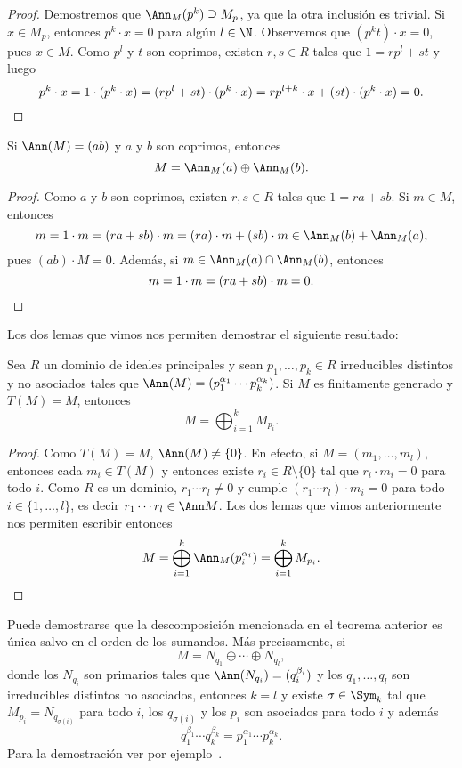 \begin{proof}
Demostremos que $\Ann_M(p^k)\supseteq M_p$, ya que la otra inclusión es trivial. 
Si $x\in M_p$, entonces $p^k\cdot x=0$ para algún $l\in\N$. Observemos que 
$(p^kt)\cdot x=0$, pues $x\in M$. Como $p^l$ y $t$ son coprimos, existen 
$r,s\in R$ tales que $1=rp^l+st$ y luego
\[
p^k\cdot x=1\cdot (p^k\cdot x)=(rp^l+st)\cdot (p^k\cdot x)=rp^{l+k}\cdot x+(st)\cdot (p^k\cdot x)=0.\qedhere	
\]
\end{proof}

\begin{lemma} 
\label{lem:Ann(ab)}
Si $\Ann(M)=(ab)$ y $a$ y $b$ son coprimos, entonces 
\[
M=\Ann_M(a)\oplus\Ann_M(b).
\] 	
\end{lemma}

\begin{proof}
	Como $a$ y $b$ son coprimos, existen $r,s\in R$ tales que $1=ra+sb$. Si $m\in M$, entonces
	\[
	m=1\cdot m=(ra+sb)\cdot m=(ra)\cdot m+(sb)\cdot m\in\Ann_M(b)+\Ann_M(a),
	\]
	pues $(ab)\cdot M=0$. Además, si $m\in\Ann_M(a)\cap\Ann_M(b)$, entonces 
	\[
	m=1\cdot m=(ra+sb)\cdot m=0.\qedhere
	\]
\end{proof}

Los dos lemas que vimos nos permiten demostrar el siguiente resultado:

\begin{theorem}
Sea $R$ un dominio de ideales principales y 
sean $p_1,\dots,p_k\in R$ irreducibles distintos y no asociados tales que $\Ann(M)=(p_1^{\alpha_1}\cdots p_k^{\alpha_k})$. 
Si $M$ es finitamente generado y $T(M)=M$, entonces 
\[
M=\bigoplus_{i=1}^kM_{p_i}.
\]   
\end{theorem}

\begin{proof}
	Como $T(M)=M$, $\Ann(M)\ne\{0\}$. En efecto, si $M=(m_1,\dots,m_l)$, entonces cada $m_i\in T(M)$ y 
	entonces existe $r_i\in R\setminus\{0\}$ tal que $r_i\cdot m_i=0$ para todo $i$. Como $R$ es un dominio, $r_1\cdots r_l\ne 0$ 
	y cumple $(r_1\cdots r_l)\cdot m_i=0$ para todo $i\in\{1,\dots,l\}$, es decir $r_1\cdots r_l\in\Ann M$. Los dos lemas
	que vimos anteriormente nos permiten escribir entonces
	\[
	M=\bigoplus_{i=1}^k\Ann_M(p_i^{\alpha_i})=\bigoplus_{i=1}^k M_{p_i}.\qedhere
	\] 
\end{proof}
 
Puede demostrarse que la descomposición mencionada en el teorema anterior es única salvo en el orden de los sumandos. 
Más precisamente, si \[
M=N_{q_1}\oplus\cdots\oplus N_{q_l},
\]
donde los $N_{q_i}$ son primarios tales que 
$\Ann(N_{q_i})=(q_i^{\beta_i})$ 
y los $q_1,\dots,q_l$ son irreducibles distintos no asociados, entonces $k=l$ y existe $\sigma\in\Sym_k$ tal que
$M_{p_i}=N_{q_{\sigma(i)}}$ para todo $i$, los $q_{\sigma(i)}$ y los $p_i$ son asociados para todo $i$ y además 
\[
q_1^{\beta_1}\cdots q_k^{\beta_k}=p_1^{\alpha_1}\cdots p_k^{\alpha_k}.
\]
Para la demostración ver por ejemplo~\cite[Theorem 6.9]{MR2344656}.

